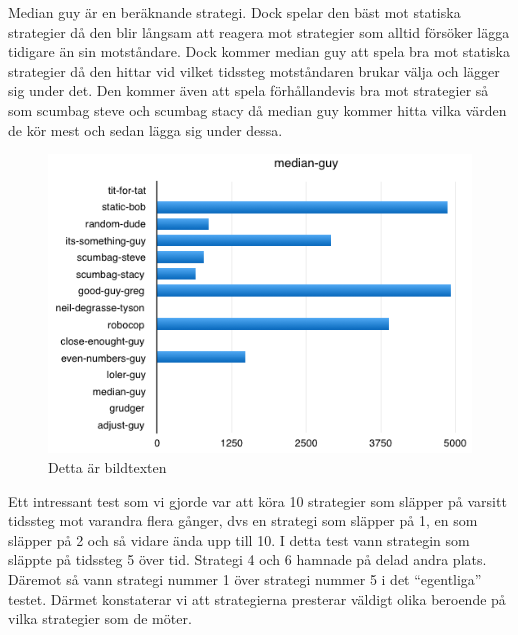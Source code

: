 Median guy är en beräknande strategi. Dock spelar den bäst mot statiska strategier då den blir långsam att reagera mot strategier som alltid försöker lägga tidigare än sin motståndare. Dock kommer median guy att spela bra mot statiska strategier då den hittar vid vilket tidssteg motståndaren brukar välja och lägger sig under det. Den kommer även att spela förhållandevis bra mot strategier så som scumbag steve och scumbag stacy då median guy kommer hitta vilka värden de kör mest och sedan lägga sig under dessa.

\begin{figure}[htb]
	\begin{center}
	\includegraphics[scale=0.75, angle=0]{bilder/median-guy.png}
	\caption{Detta är bildtexten}
	\label{median-guy}
	\end{center}
\end{figure}


\noindent Ett intressant test som vi gjorde var att köra 10 strategier som släpper på varsitt tidssteg mot varandra flera gånger, dvs en strategi som släpper på 1, en som släpper på 2 och så vidare ända upp till 10. I detta test vann strategin som släppte på tidssteg 5 över tid. Strategi 4 och 6 hamnade på delad andra plats. Däremot så vann strategi nummer 1 över strategi nummer 5 i det “egentliga” testet. Därmet konstaterar vi att strategierna presterar väldigt olika beroende på vilka strategier som de möter.

